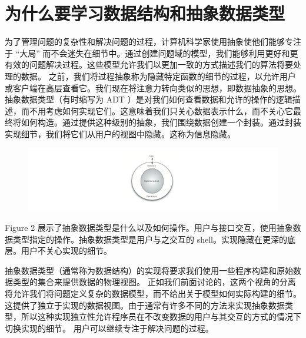 \section{为什么要学习数据结构和抽象数据类型}

为了管理问题的复杂性和解决问题的过程，计算机科学家使用抽象使他们能够专注于 “大局” 而不会迷失在细节中。通过创建问题域的模型，我们能够利用更好和更有效的问题解决过程。这些模型允许我们以更加一致的方式描述我们的算法将要处理的数据。
之前，我们将过程抽象称为隐藏特定函数的细节的过程，以允许用户或客户端在高层查看它。我们现在将注意力转向类似的思想，即数据抽象的思想。抽象数据类型（有时缩写为 ADT ）是对我们如何查看数据和允许的操作的逻辑描述，而不用考虑如何实现它们。这意味着我们只关心数据表示什么，而不关心它最终将如何构造。通过提供这种级别的抽象，我们围绕数据创建一个封装。通过封装实现细节，我们将它们从用户的视图中隐藏。这称为信息隐藏。
\begin{figure}[htbp]
  \centering
  \includegraphics[width=6in]{images/ds_adt.png}
\end{figure}

Figure 2 展示了抽象数据类型是什么以及如何操作。用户与接口交互，使用抽象数据类型指定的操作。抽象数据类型是用户与之交互的 shell。实现隐藏在更深的底层。用户不关心实现的细节。 



抽象数据类型（通常称为数据结构）的实现将要求我们使用一些程序构建和原始数据类型的集合来提供数据的物理视图。 正如我们前面讨论的，这两个视角的分离将允许我们将问题定义复杂的数据模型，而不给出关于模型如何实际构建的细节。 这提供了独立于实现的数据视图。由于通常有许多不同的方法来实现抽象数据类型，所以这种实现独立性允许程序员在不改变数据的用户与其交互的方式的情况下切换实现的细节。 用户可以继续专注于解决问题的过程。
